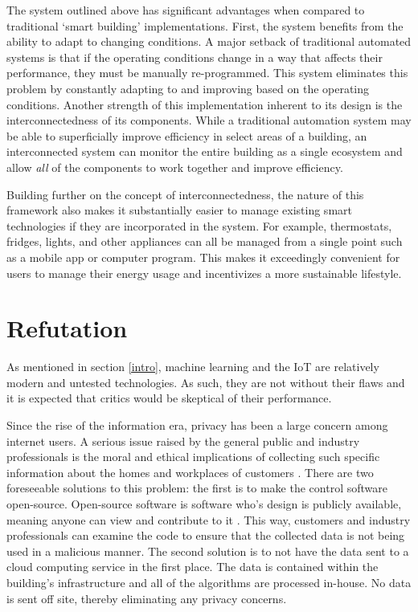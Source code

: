\documentclass[letterpaper]{article}
\begin{document}
The system outlined above has significant advantages when compared to traditional `smart building' implementations. First, the system benefits from the ability to adapt to changing conditions. A major setback of traditional automated systems is that if the operating conditions change in a way that affects their performance, they must be manually re-programmed. This system eliminates this problem by constantly adapting to and improving based on the operating conditions. Another strength of this implementation inherent to its design is the interconnectedness of its components. While a traditional automation system may be able to superficially improve efficiency in select areas of a building, an interconnected system can monitor the entire building as a single ecosystem and allow \emph{all} of the components to work together and improve efficiency.\par

Building further on the concept of interconnectedness, the nature of this framework also makes it substantially easier to manage existing smart technologies if they are incorporated in the system. For example, thermostats, fridges, lights, and other appliances can all be managed from a single point such as a mobile app or computer program. This makes it exceedingly convenient for users to manage their energy usage and incentivizes a more sustainable lifestyle.

\section{Refutation} \label{refute}
As mentioned in section \ref{intro}, machine learning and the IoT are relatively modern and untested technologies. As such, they are not without their flaws and it is expected that critics would be skeptical of their performance.\par

Since the rise of the information era, privacy has been a large concern among internet users. A serious issue raised by the general public and industry professionals is the moral and ethical implications of collecting such specific information about the homes and workplaces of customers \cite{perisic16, mccalman17}. There are two foreseeable solutions to this problem: the first is to make the control software open-source. Open-source software is software who's design is publicly available, meaning anyone can view and contribute to it \cite{opensource}. This way, customers and industry professionals can examine the code to ensure that the collected data is not being used in a malicious manner. The second solution is to not have the data sent to a cloud computing service in the first place. The data is contained within the building's infrastructure and all of the algorithms are processed in-house. No data is sent off site, thereby eliminating any privacy concerns.\par
\end{document}
